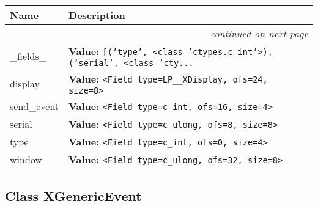     \vspace{-1cm}
\hspace{\varindent}\begin{longtable}{|p{\varnamewidth}|p{\vardescrwidth}|l}
\cline{1-2}
\cline{1-2} \centering \textbf{Name} & \centering \textbf{Description}& \\
\cline{1-2}
\endhead\cline{1-2}\multicolumn{3}{r}{\small\textit{continued on next page}}\\\endfoot\cline{1-2}
\endlastfoot\raggedright \_\-f\-i\-e\-l\-d\-s\-\_\- & \raggedright \textbf{Value:} 
{\tt \texttt{[}\texttt{(}\texttt{'}\texttt{type}\texttt{'}\texttt{, }{\textless}class 'ctypes.c\_int'{\textgreater}\texttt{)}\texttt{, }\texttt{(}\texttt{'}\texttt{serial}\texttt{'}\texttt{, }{\textless}class 'cty\texttt{...}}&\\
\cline{1-2}
\raggedright d\-i\-s\-p\-l\-a\-y\- & \raggedright \textbf{Value:} 
{\tt {\textless}Field type=LP\_\_XDisplay, ofs=24, size=8{\textgreater}}&\\
\cline{1-2}
\raggedright s\-e\-n\-d\-\_\-e\-v\-e\-n\-t\- & \raggedright \textbf{Value:} 
{\tt {\textless}Field type=c\_int, ofs=16, size=4{\textgreater}}&\\
\cline{1-2}
\raggedright s\-e\-r\-i\-a\-l\- & \raggedright \textbf{Value:} 
{\tt {\textless}Field type=c\_ulong, ofs=8, size=8{\textgreater}}&\\
\cline{1-2}
\raggedright t\-y\-p\-e\- & \raggedright \textbf{Value:} 
{\tt {\textless}Field type=c\_int, ofs=0, size=4{\textgreater}}&\\
\cline{1-2}
\raggedright w\-i\-n\-d\-o\-w\- & \raggedright \textbf{Value:} 
{\tt {\textless}Field type=c\_ulong, ofs=32, size=8{\textgreater}}&\\
\cline{1-2}
\end{longtable}



\subsection{Class XGenericEvent}

